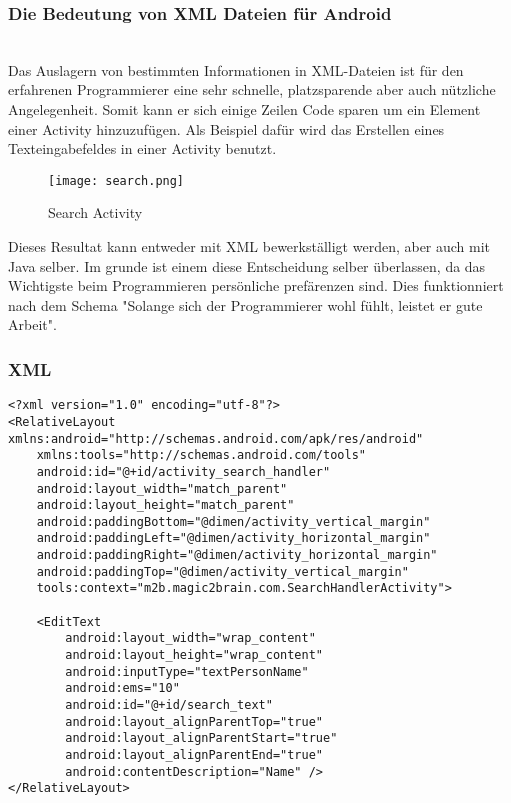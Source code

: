 \subsubsection{Die Bedeutung von XML Dateien für Android}\\

Das Auslagern von bestimmten Informationen in XML-Dateien ist für den erfahrenen Programmierer eine sehr schnelle, platzsparende aber auch nützliche Angelegenheit.
Somit kann er sich einige Zeilen Code sparen um ein Element einer Activity hinzuzufügen. Als Beispiel dafür wird das Erstellen eines Texteingabefeldes in einer Activity benutzt.

\begin{figure}[htbp] 
  \centering
     \texttt{[image: search.png]}
  \caption{Search Activity \cite{search_app}}
  \label{fig:SearchActivity}
\end{figure}

Dieses Resultat kann entweder mit XML bewerkställigt werden, aber auch mit Java selber. Im grunde ist einem diese Entscheidung selber überlassen, da das Wichtigste beim Programmieren persönliche prefärenzen sind. Dies funktionniert nach dem Schema "Solange sich der Programmierer wohl fühlt, leistet er gute Arbeit".\\

\subsubsection*{XML}
\begin{lstlisting}
<?xml version="1.0" encoding="utf-8"?>
<RelativeLayout xmlns:android="http://schemas.android.com/apk/res/android"
    xmlns:tools="http://schemas.android.com/tools"
    android:id="@+id/activity_search_handler"
    android:layout_width="match_parent"
    android:layout_height="match_parent"
    android:paddingBottom="@dimen/activity_vertical_margin"
    android:paddingLeft="@dimen/activity_horizontal_margin"
    android:paddingRight="@dimen/activity_horizontal_margin"
    android:paddingTop="@dimen/activity_vertical_margin"
    tools:context="m2b.magic2brain.com.SearchHandlerActivity">

    <EditText
        android:layout_width="wrap_content"
        android:layout_height="wrap_content"
        android:inputType="textPersonName"
        android:ems="10"
        android:id="@+id/search_text"
        android:layout_alignParentTop="true"
        android:layout_alignParentStart="true"
        android:layout_alignParentEnd="true"
        android:contentDescription="Name" />
</RelativeLayout>
\end{lstlisting}

